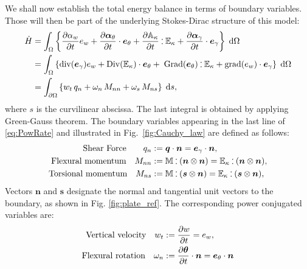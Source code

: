 \documentclass[preprint,12pt]{elsarticle}
\def\onedot{$\mathsurround0pt\ldotp$}
\def\cddot{%
	\mathbin{\vcenter{\baselineskip.67ex
			\hbox{\onedot}\hbox{\onedot}}%
}}
\begin{document}
{
We shall now establish the total energy balance in terms of boundary variables. Those will then be part of the underlying Stokes-Dirac structure of this model:
\begin{equation}
\label{eq:PowRate}
\begin{aligned}
\dot{H}&= \int_{\Omega} \left\{ \diffp{\alpha_w}{t} e_w  + \diffp{\bm\alpha_\theta}{t} \cdot \bm{e}_\theta + \diffp{\mathbb{A}_{\kappa}}{t} \cddot \mathbb{E}_{\kappa}  + \diffp{\bm\alpha_{\gamma}}{t} \cdot \bm{e}_{\gamma} \right\} \d\Omega\\
&= \int_{\Omega} \left\{ \mathrm{div}(\bm{e}_{\gamma}) e_w  + \mathrm{Div}(\mathbb{E}_{\kappa}) \cdot \bm{e}_\theta + \; \mathrm{Grad}(\bm{e}_{\theta}) \cddot \mathbb{E}_{\kappa}  + \mathrm{grad} (e_w) \cdot \bm{e}_{\gamma} \right\} \d\Omega \\
&= \int_{\partial \Omega} \left\{ w_t \, q_n  + \omega_n \, M_{nn} + \omega_s \, M_{ns} \right\} \d{s},  \\
\end{aligned}
\end{equation}
where $s$ is the curvilinear abscissa. The last integral is obtained by applying Green-Gauss theorem. The boundary variables appearing in the last line of \eqref{eq:PowRate} and illustrated in Fig.~\ref{fig:Cauchy_law} are defined as follows:
\begin{equation}
\label{eq:QnMnnMns}
\begin{aligned}
\text{Shear Force}  \qquad q_{n} &:= \bm{q} \cdot \bm{n}=  \bm{e}_{\gamma} \cdot \bm{n},  \\
\text{Flexural momentum} \quad 
M_{nn} &:=  \mathbb{M} \cddot (\bm{n}\otimes{\bm{n}}) = \mathbb{E}_{\kappa} \cddot (\bm{n}\otimes{\bm{n}}) 	\\
\text{Torsional momentum} \quad M_{ns} &:= \mathbb{M} \cddot (\bm{s}\otimes{\bm{n}}) = \mathbb{E}_{\kappa} \cddot (\bm{s}\otimes{\bm{n}}),	
\end{aligned},
\end{equation}
Vectors $\bm{n}$ and $\bm{s}$ designate the normal and tangential unit vectors to the boundary, as shown in Fig. \ref{fig:plate_ref}. The corresponding power conjugated variables are:
\begin{equation}
\label{eq:wtwnws}
\begin{aligned}
\text{Vertical velocity}  \quad w_t &:= \diffp{w}{t} = e_w, \\
\text{Flexural rotation} \quad 
\omega_{n} &:= \diffp{\bm{\theta}}{t} \cdot \bm{n} = \bm{e}_\theta \cdot \bm{n} \\

\end{aligned}
\end{equation}}
\end{document}

